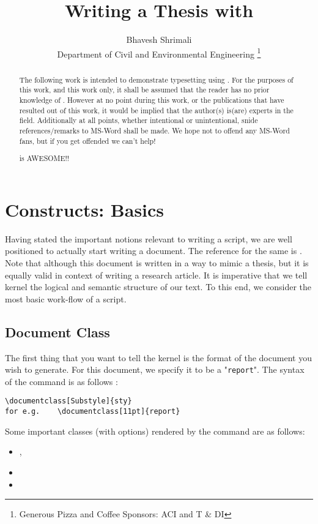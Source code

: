 
\title{Writing a Thesis with \latex}
\author{Bhavesh Shrimali \\ Department of Civil and Environmental Engineering \thanks{Generous Pizza and Coffee Sponsors: ACI and T \& DI}}

\maketitle
\begin{abstract}
The following work is intended to demonstrate typesetting using \latex. For the purposes of this work, and this work only, it shall be assumed that the reader has no prior knowledge of \latex. However at no point during this work, or the publications that have resulted out of this work, it would be implied that the author(s) is(are) experts in the field. Additionally at all points, whether intentional or unintentional, snide references/remarks to MS-Word shall be made. We hope not to offend any MS-Word fans, but if you get offended we can't help! 
\begin{Huge}
\begin{center}
\latex is AWESOME!!
\end{center}
\end{Huge} 
\end{abstract}
\tableofcontents\newpage
\listoffigures\newpage
\listoftables\newpage
\chapter{\latex Constructs: Basics}
Having stated the important notions relevant to writing a \latex script, we are well positioned to actually start writing a document. The reference for the same is  \cite{lamport1985i1}. Note that although this document is written in a way to mimic a thesis, but it is equally valid in context of writing a research article. It is imperative that we tell \latex kernel the logical and semantic structure of our text. To this end, we consider the most basic work-flow of a \latex script.  
\section{Document Class}
The first thing that you want to tell the kernel is the format of the document you wish to generate. For this document, we specify it to be a "\texttt{report}". The syntax of the command is as follows : \\
\begin{lstlisting}[frame=single]
		\documentclass[Substyle]{sty}
for e.g.	\documentclass[11pt]{report}
\end{lstlisting}
Some important classes (with options) rendered by the  command are as follows: 
\begin{itemize}
\item {}, 
\item {}
\item {}
\end{itemize}
